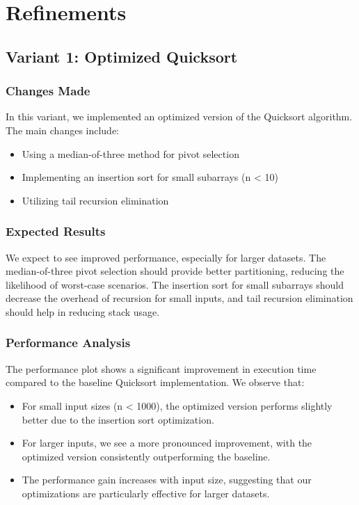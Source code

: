 \documentclass[twocolumn]{article}
\begin{document}
\section{Refinements}

\subsection{Variant 1: Optimized Quicksort}

\subsubsection{Changes Made}
In this variant, we implemented an optimized version of the Quicksort algorithm. The main changes include:
\begin{itemize}
    \item Using a median-of-three method for pivot selection
    \item Implementing an insertion sort for small subarrays (n < 10)
    \item Utilizing tail recursion elimination
\end{itemize}

\subsubsection{Expected Results}
We expect to see improved performance, especially for larger datasets. The median-of-three pivot selection should provide better partitioning, reducing the likelihood of worst-case scenarios. The insertion sort for small subarrays should decrease the overhead of recursion for small inputs, and tail recursion elimination should help in reducing stack usage.

\subsubsection{Performance Analysis}

The performance plot shows a significant improvement in execution time compared to the baseline Quicksort implementation. We observe that:
\begin{itemize}
    \item For small input sizes (n < 1000), the optimized version performs slightly better due to the insertion sort optimization.
    \item For larger inputs, we see a more pronounced improvement, with the optimized version consistently outperforming the baseline.
    \item The performance gain increases with input size, suggesting that our optimizations are particularly effective for larger datasets.
\end{itemize}
\end{document}
